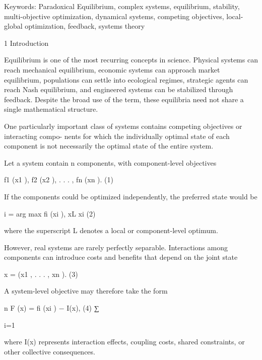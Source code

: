 \documentclass[10pt,a4paper]{article}
\begin{document}
\begin{ManuscriptText}
Keywords: Paradoxical Equilibrium, complex systems, equilibrium, stability, multi-objective
optimization, dynamical systems, competing objectives, local-global optimization, feedback,
systems theory


1    Introduction

Equilibrium is one of the most recurring concepts in science. Physical systems can reach
mechanical equilibrium, economic systems can approach market equilibrium, populations can
settle into ecological regimes, strategic agents can reach Nash equilibrium, and engineered
systems can be stabilized through feedback. Despite the broad use of the term, these equilibria
need not share a single mathematical structure.

One particularly important class of systems contains competing objectives or interacting compo-
nents for which the individually optimal state of each component is not necessarily the optimal
state of the entire system.

Let a system contain n components, with component-level objectives


                                    f1 (x1 ), f2 (x2 ), . . . , fn (xn ).                        (1)

If the components could be optimized independently, the preferred state would be


                                        i = arg max fi (xi ),
                                       xL
                                                       xi
                                                                                                 (2)

where the superscript L denotes a local or component-level optimum.

However, real systems are rarely perfectly separable. Interactions among components can
introduce costs and benefits that depend on the joint state


                                          x = (x1 , . . . , xn ).                                (3)

A system-level objective may therefore take the form

                                                 n
                                    F (x) =           fi (xi ) − I(x),                           (4)
                                                ∑︂

                                                i=1


where I(x) represents interaction effects, coupling costs, shared constraints, or other collective
consequences.


\end{ManuscriptText}
\end{document}
